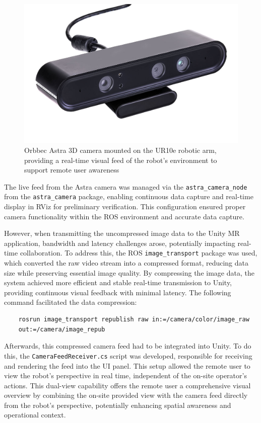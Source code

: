 \begin{figure}[h]
    \centering
    \includegraphics[width=0.5\linewidth]{figs/AstraSeries_3.jpg}
    \caption{Orbbec Astra 3D camera mounted on the UR10e robotic arm, providing a real-time visual feed of the robot's environment to support remote user awareness}
    \label{fig:astra-camera}
\end{figure}

The live feed from the Astra camera was managed via the \texttt{astra\_camera\_node} from the \texttt{astra\_camera} package, enabling continuous data capture and real-time display in RViz for preliminary verification. This configuration ensured proper camera functionality within the \ac{ROS} environment and accurate data capture. 

However, when transmitting the uncompressed image data to the Unity \ac{MR} application, bandwidth and latency challenges arose, potentially impacting real-time collaboration. To address this, the \ac{ROS} \texttt{image\_transport} package was used, which converted the raw video stream into a compressed format, reducing data size while preserving essential image quality. By compressing the image data, the system achieved more efficient and stable real-time transmission to Unity, providing continuous visual feedback with minimal latency. The following command facilitated the data compression:

\begin{verbatim} 
    rosrun image_transport republish raw in:=/camera/color/image_raw 
    out:=/camera/image_repub 
\end{verbatim}

Afterwards, this compressed camera feed had to be integrated into Unity. To do this, the \texttt{CameraFeedReceiver.cs} script was developed, responsible for receiving and rendering the feed into the \ac{UI} panel. This setup allowed the remote user to view the robot’s perspective in real time, independent of the on-site operator’s actions. This dual-view capability offers the remote user a comprehensive visual overview by combining the on-site provided view with the camera feed directly from the robot’s perspective, potentially enhancing spatial awareness and operational context.

